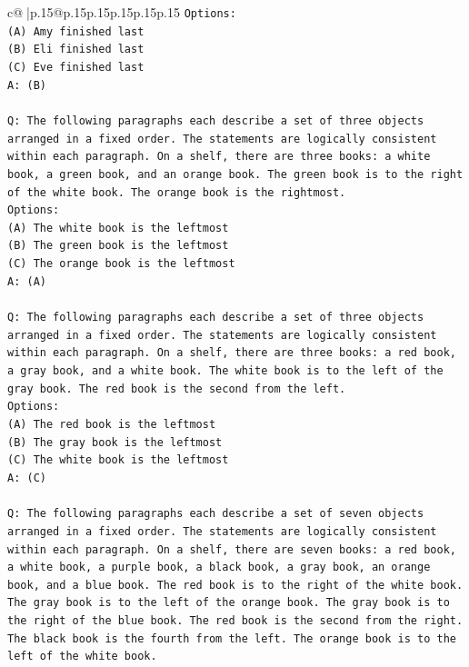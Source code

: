 \documentclass{article}
\begin{document}
{\begin{supertabular}{c@{$\;$}|p{.15\linewidth}@{}p{.15\linewidth}p{.15\linewidth}p{.15\linewidth}p{.15\linewidth}p{.15\linewidth}}
{{{\texttt{Options:} \\
\texttt{(A) Amy finished last} \\
\texttt{(B) Eli finished last} \\
\texttt{(C) Eve finished last} \\
\texttt{A: (B)} \\
\\ 
\texttt{Q: The following paragraphs each describe a set of three objects arranged in a fixed order. The statements are logically consistent within each paragraph. On a shelf, there are three books: a white book, a green book, and an orange book. The green book is to the right of the white book. The orange book is the rightmost.} \\
\texttt{Options:} \\
\texttt{(A) The white book is the leftmost} \\
\texttt{(B) The green book is the leftmost} \\
\texttt{(C) The orange book is the leftmost} \\
\texttt{A: (A)} \\
\\ 
\texttt{Q: The following paragraphs each describe a set of three objects arranged in a fixed order. The statements are logically consistent within each paragraph. On a shelf, there are three books: a red book, a gray book, and a white book. The white book is to the left of the gray book. The red book is the second from the left.} \\
\texttt{Options:} \\
\texttt{(A) The red book is the leftmost} \\
\texttt{(B) The gray book is the leftmost} \\
\texttt{(C) The white book is the leftmost} \\
\texttt{A: (C)} \\
\\ 
\texttt{Q: The following paragraphs each describe a set of seven objects arranged in a fixed order. The statements are logically consistent within each paragraph. On a shelf, there are seven books: a red book, a white book, a purple book, a black book, a gray book, an orange book, and a blue book. The red book is to the right of the white book. The gray book is to the left of the orange book. The gray book is to the right of the blue book. The red book is the second from the right. The black book is the fourth from the left. The orange book is to the left of the white book.} \\
}}}
\end{supertabular}}
\end{document}
